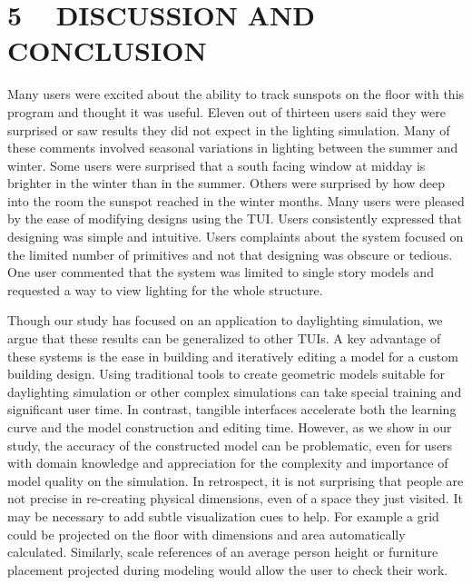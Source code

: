 \documentclass{article}
\begin{document}

\section{5 ~ DISCUSSION AND CONCLUSION}

Many users were excited about the ability to track sunspots on the
floor with this program and thought it was useful. 
%
Eleven out of thirteen users said they were surprised or saw results
they did not expect in the lighting simulation.  Many of these
comments involved seasonal variations in lighting between the summer
and winter.  Some users were surprised that a south facing window at
midday is brighter in the winter than in the summer.  Others were
surprised by how deep into the room the sunspot reached in the winter
months.
%
Many users were pleased by the ease of modifying designs using the
TUI.  Users consistently expressed that designing was simple and
intuitive.  Users complaints about the system focused on the limited
number of primitives and not that designing was obscure or tedious.
One user commented that the system was limited to single story models
and requested a way to view lighting for the whole structure.


Though our study has focused on an application to daylighting
simulation, we argue that these results can be generalized to other
TUIs.  A key advantage of these systems is the ease in building and
iteratively editing a model for a custom building design.  Using
traditional tools to create geometric models suitable for daylighting
simulation or other complex simulations can take special training and
significant user time.  In contrast, tangible interfaces accelerate
both the learning curve and the model construction and editing time.
However, as we show in our study, the accuracy of the constructed
model can be problematic, even for users with domain knowledge and
appreciation for the complexity and importance of model quality on the
simulation.  
%
In retrospect, it is not surprising that people are not precise in
re-creating physical dimensions, even of a space they just visited.
It may be necessary to add subtle visualization cues to help.  For
example a grid could be projected on the floor with dimensions and
area automatically calculated.  Similarly, scale references of an
average person height or furniture placement projected during modeling
would allow the user to check their work.
\end{document}
